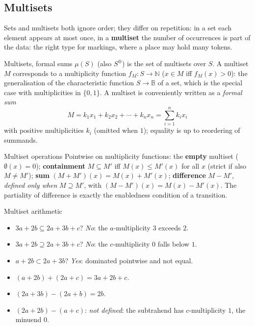 \subsection{Multisets}

Sets and multisets both ignore order; they differ on repetition: in a set each element appears at most once, in a \textbf{multiset} the number of occurrences is part of the data: the right type for markings, where a place may hold many tokens.

\begin{definitionbox}{Multisets, formal sums}
$\mu(S)$ (also $S^{\oplus}$) is the set of multisets over $S$. A multiset $M$ corresponds to a multiplicity function $f_M : S \to \mathbb{N}$ ($x \in M$ iff $f_M(x) > 0$): the generalisation of the characteristic function $S \to \mathbb{B}$ of a set, which is the special case with multiplicities in $\{0,1\}$. A multiset is conveniently written as a \emph{formal sum}
\[
  M = k_1 x_1 + k_2 x_2 + \cdots + k_n x_n = \sum_{i=1}^{n} k_i x_i
\]
with positive multiplicities $k_i$ (omitted when $1$); equality is up to reordering of summands.
\end{definitionbox}

\begin{definitionbox}{Multiset operations}
Pointwise on multiplicity functions: the \textbf{empty} multiset ($\emptyset(x) = 0$); \textbf{containment} $M \subseteq M'$ iff $M(x) \leq M'(x)$ for all $x$ (strict if also $M \neq M'$); \textbf{sum} $(M + M')(x) = M(x) + M'(x)$; \textbf{difference} $M - M'$, \emph{defined only when} $M \supseteq M'$, with $(M - M')(x) = M(x) - M'(x)$. The partiality of difference is exactly the enabledness condition of a transition.
\end{definitionbox}

\begin{examplebox}{Multiset arithmetic}
\begin{itemize}
  \item $3a + 2b \subseteq 2a + 3b + c$? \emph{No}: the $a$-multiplicity $3$ exceeds $2$.
  \item $3a + 2b \supseteq 2a + 3b + c$? \emph{No}: the $c$-multiplicity $0$ falls below $1$.
  \item $a + 2b \subset 2a + 3b$? \emph{Yes}: dominated pointwise and not equal.
  \item $(a + 2b) + (2a + c) = 3a + 2b + c$.
  \item $(2a + 3b) - (2a + b) = 2b$.
  \item $(2a + 2b) - (a + c)$: \emph{not defined}: the subtrahend has $c$-multiplicity $1$, the minuend $0$.
\end{itemize}
\end{examplebox}

